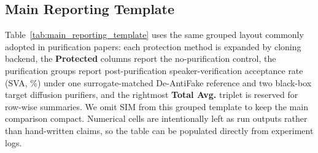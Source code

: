 \subsection{Main Reporting Template}

Table~\ref{tab:main_reporting_template} uses the same grouped layout commonly adopted in purification papers: 
each protection method is expanded by cloning backend, the \textbf{Protected} columns report the no-purification control, 
the purification groups report post-purification speaker-verification acceptance rate (SVA, \%) under one surrogate-matched De-AntiFake reference and two black-box target diffusion purifiers, 
and the rightmost \textbf{Total Avg.} triplet is reserved for row-wise summaries. 
We omit SIM from this grouped template to keep the main comparison compact. Numerical cells are intentionally left as run outputs rather than hand-written claims, 
so the table can be populated directly from experiment logs.

